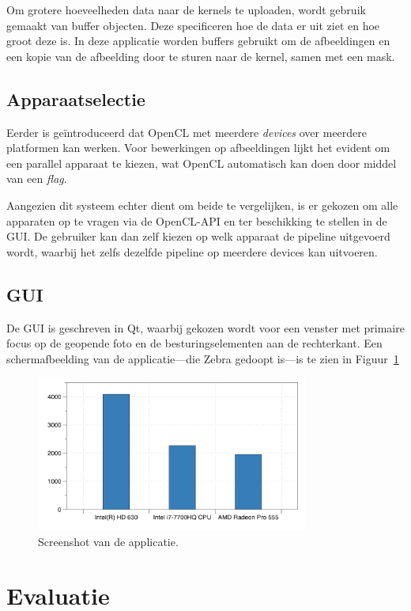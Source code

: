 \documentclass[twocolumn, a4paper]{article}
\begin{document}
Om grotere hoeveelheden data naar de kernels te uploaden, wordt gebruik gemaakt van buffer objecten. Deze specificeren hoe de data er uit ziet en hoe groot deze is. In deze applicatie worden buffers gebruikt om de afbeeldingen en een kopie van de afbeelding door te sturen naar de kernel, samen met een mask.

\subsection{Apparaatselectie}
Eerder is geïntroduceerd dat OpenCL met meerdere \emph{devices} over meerdere platformen kan werken. Voor bewerkingen op afbeeldingen lijkt het evident om een parallel apparaat te kiezen, wat OpenCL automatisch kan doen door middel van een \emph{flag}. 

Aangezien dit systeem echter dient om beide te vergelijken, is er gekozen om alle apparaten op te vragen via de OpenCL-API en ter beschikking te stellen in de GUI. De gebruiker kan dan zelf kiezen op welk apparaat de pipeline uitgevoerd wordt, waarbij het zelfs dezelfde pipeline op meerdere devices kan uitvoeren. 

\subsection{GUI}
De GUI is geschreven in Qt, waarbij gekozen wordt voor een venster met primaire focus op de geopende foto en de besturingselementen aan de rechterkant. Een schermafbeelding van de applicatie---die Zebra gedoopt is---is te zien in Figuur~\ref{fig:gui} 

\begin{figure}[htb]
    \centering
    \includegraphics[width=0.8\textwidth]{data/zebra.png}
    \caption{Screenshot van de applicatie.}\label{fig:gui}
\end{figure}

\section{Evaluatie}
\end{document}
